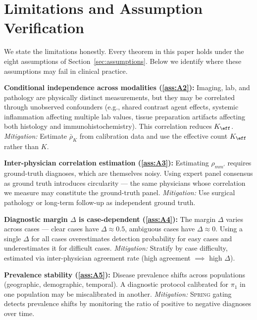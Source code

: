 \documentclass[11pt,a4paper]{article}
\theoremstyle{definition}
\newcommand{\Spring}{\textsc{Spring}}
\newcommand{\limitationTag}[1]{\textsf{\textbf{[L#1]}}}
\begin{document}
\section{Limitations and Assumption Verification}
\label{sec:limitations}

We state the limitations honestly. Every theorem in this paper holds
under the eight assumptions of Section~\ref{sec:assumptions}. Below we
identify where these assumptions may fail in clinical practice.

\begin{enumerate}[label=\limitationTag{\arabic*}, nosep]

    \item \textbf{Conditional independence across modalities (\ref{ass:A2}):}
    Imaging, lab, and pathology are physically distinct measurements, but
    they may be correlated through unobserved confounders (e.g., shared
    contrast agent effects, systemic inflammation affecting multiple lab
    values, tissue preparation artifacts affecting both histology and
    immunohistochemistry). This correlation reduces $K_{\eff}$.
    \textit{Mitigation:} Estimate $\bar{\rho}_K$ from calibration data and
    use the effective count $K_{\eff}$ rather than $K$.

    \item \textbf{Inter-physician correlation estimation (\ref{ass:A3}):}
    Estimating $\rho_{mm'}$ requires ground-truth diagnoses, which are
    themselves noisy. Using expert panel consensus as ground truth introduces
    circularity --- the same physicians whose correlation we measure may
    constitute the ground-truth panel. \textit{Mitigation:} Use surgical
    pathology or long-term follow-up as independent ground truth.

    \item \textbf{Diagnostic margin $\Delta$ is case-dependent (\ref{ass:A4}):}
    The margin $\Delta$ varies across cases --- clear cases have $\Delta \approx 0.5$,
    ambiguous cases have $\Delta \approx 0$. Using a single $\Delta$ for
    all cases overestimates detection probability for easy cases and
    underestimates it for difficult cases. \textit{Mitigation:} Stratify
    by case difficulty, estimated via inter-physician agreement rate
    (high agreement $\implies$ high $\Delta$).

    \item \textbf{Prevalence stability (\ref{ass:A5}):} Disease prevalence
    shifts across populations (geographic, demographic, temporal). A diagnostic
    protocol calibrated for $\pi_1$ in one population may be miscalibrated
    in another. \textit{Mitigation:} \Spring{} gating detects prevalence
    shifts by monitoring the ratio of positive to negative diagnoses over time.


\end{enumerate}
\end{document}
